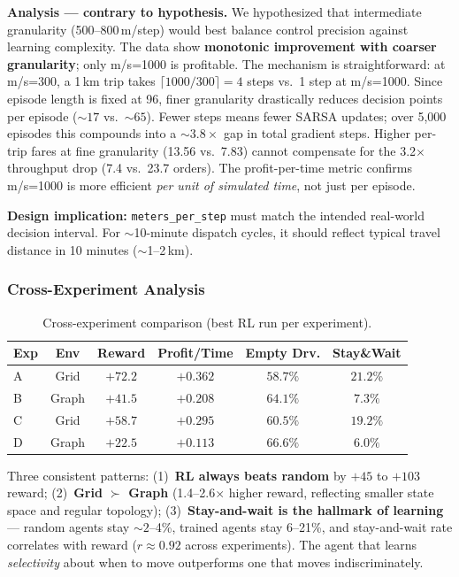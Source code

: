 \textbf{Analysis — contrary to hypothesis.} We hypothesized that intermediate granularity (500--800\,m/step) would best balance control precision against learning complexity. The data show \textbf{monotonic improvement with coarser granularity}; only m/s{=}1000 is profitable. The mechanism is straightforward: at m/s{=}300, a 1\,km trip takes $\lceil 1000/300\rceil{=}4$ steps vs.\ 1 step at m/s{=}1000. Since episode length is fixed at 96, finer granularity drastically reduces decision points per episode (${\sim}17$ vs.\ ${\sim}65$). Fewer steps means fewer SARSA updates; over 5,000 episodes this compounds into a ${\sim}3.8{\times}$ gap in total gradient steps. Higher per-trip fares at fine granularity (13.56 vs.\ 7.83) cannot compensate for the 3.2$\times$ throughput drop (7.4 vs.\ 23.7 orders). The profit-per-time metric confirms m/s{=}1000 is more efficient \emph{per unit of simulated time}, not just per episode.

\textbf{Design implication:} \texttt{meters\_per\_step} must match the intended real-world decision interval. For $\sim$10-minute dispatch cycles, it should reflect typical travel distance in 10 minutes ($\sim$1--2\,km).

\subsubsection{Cross-Experiment Analysis}

\begin{table}[ht]
\centering
\caption{Cross-experiment comparison (best RL run per experiment).}
\label{tab:cross}
\begin{tabular}{lccccc}
\toprule
\textbf{Exp} & \textbf{Env} & \textbf{Reward} & \textbf{Profit/Time} & \textbf{Empty Drv.} & \textbf{Stay\&Wait} \\
\midrule
A & Grid  & $+72.2$ & $+0.362$ & $58.7\%$ & $21.2\%$ \\
B & Graph & $+41.5$ & $+0.208$ & $64.1\%$ & $7.3\%$  \\
C & Grid  & $+58.7$ & $+0.295$ & $60.5\%$ & $19.2\%$ \\
D & Graph & $+22.5$ & $+0.113$ & $66.6\%$ & $6.0\%$  \\
\bottomrule
\end{tabular}
\end{table}

Three consistent patterns: (1)~\textbf{RL always beats random} by $+45$ to $+103$ reward; (2)~\textbf{Grid $\succ$ Graph} (1.4--2.6$\times$ higher reward, reflecting smaller state space and regular topology); (3)~\textbf{Stay-and-wait is the hallmark of learning} — random agents stay ${\sim}2$--4\%, trained agents stay 6--21\%, and stay-and-wait rate correlates with reward ($r{\approx}0.92$ across experiments). The agent that learns \emph{selectivity} about when to move outperforms one that moves indiscriminately.

